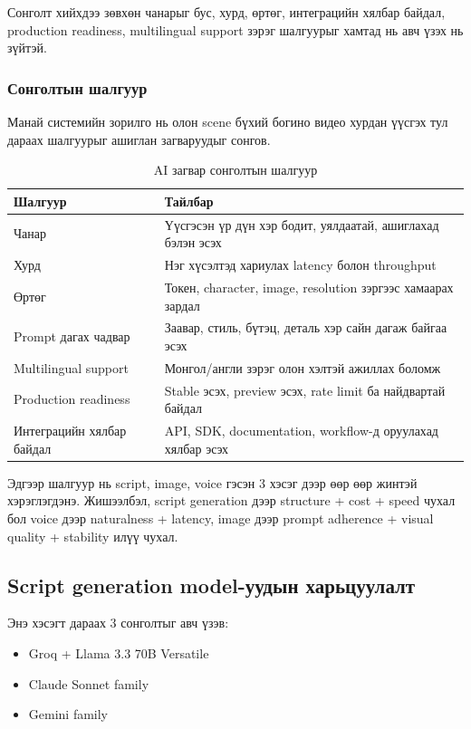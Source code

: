 Сонголт хийхдээ зөвхөн чанарыг бус, хурд, өртөг, интеграцийн хялбар байдал, production readiness, multilingual support зэрэг шалгуурыг хамтад нь авч үзэх нь зүйтэй.

\subsubsection{Сонголтын шалгуур}

Манай системийн зорилго нь олон scene бүхий богино видео хурдан үүсгэх тул дараах шалгуурыг ашиглан загваруудыг сонгов.

\begin{table}[H]
\centering
\label{tab:criteria}
\begin{tabular}{|l|p{8cm}|}
\hline
\textbf{Шалгуур} & \textbf{Тайлбар} \\
\hline
Чанар & Үүсгэсэн үр дүн хэр бодит, уялдаатай, ашиглахад бэлэн эсэх \\
\hline
Хурд & Нэг хүсэлтэд хариулах latency болон throughput \\
\hline
Өртөг & Токен, character, image, resolution зэргээс хамаарах зардал \\
\hline
Prompt дагах чадвар & Заавар, стиль, бүтэц, деталь хэр сайн дагаж байгаа эсэх \\
\hline
Multilingual support & Монгол/англи зэрэг олон хэлтэй ажиллах боломж \\
\hline
Production readiness & Stable эсэх, preview эсэх, rate limit ба найдвартай байдал \\
\hline
Интеграцийн хялбар байдал & API, SDK, documentation, workflow-д оруулахад хялбар эсэх \\
\hline
\end{tabular}
\caption{AI загвар сонголтын шалгуур}
\end{table}

Эдгээр шалгуур нь script, image, voice гэсэн 3 хэсэг дээр өөр өөр жинтэй хэрэглэгдэнэ. Жишээлбэл, script generation дээр structure + cost + speed чухал бол voice дээр naturalness + latency, image дээр prompt adherence + visual quality + stability илүү чухал.

\subsection{Script generation model-уудын харьцуулалт}

Энэ хэсэгт дараах 3 сонголтыг авч үзэв:

\begin{itemize}
\item Groq + Llama 3.3 70B Versatile
\item Claude Sonnet family
\item Gemini family
\end{itemize}


